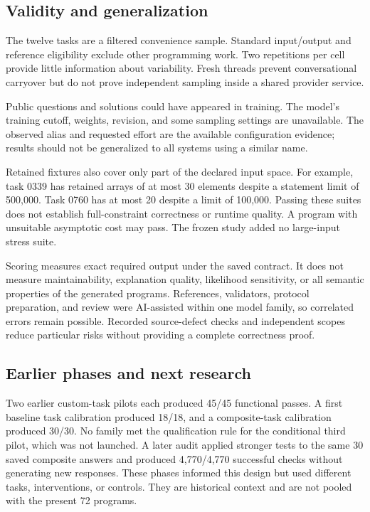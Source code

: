\documentclass[conference,a4paper]{IEEEtran}
\begin{document}
\subsection{Validity and generalization}
The twelve tasks are a filtered convenience sample. Standard input/output and reference eligibility exclude other programming work. Two repetitions per cell provide little information about variability. Fresh threads prevent conversational carryover but do not prove independent sampling inside a shared provider service.

Public questions and solutions could have appeared in training. The model's training cutoff, weights, revision, and some sampling settings are unavailable. The observed alias and requested effort are the available configuration evidence; results should not be generalized to all systems using a similar name.

Retained fixtures also cover only part of the declared input space. For example, task 0339 has retained arrays of at most 30 elements despite a statement limit of 500,000. Task 0760 has at most 20 despite a limit of 100,000. Passing these suites does not establish full-constraint correctness or runtime quality. A program with unsuitable asymptotic cost may pass. The frozen study added no large-input stress suite.

Scoring measures exact required output under the saved contract. It does not measure maintainability, explanation quality, likelihood sensitivity, or all semantic properties of the generated programs. References, validators, protocol preparation, and review were AI-assisted within one model family, so correlated errors remain possible. Recorded source-defect checks and independent scopes reduce particular risks without providing a complete correctness proof.

\subsection{Earlier phases and next research}
Two earlier custom-task pilots each produced 45/45 functional passes. A first baseline task calibration produced 18/18, and a composite-task calibration produced 30/30. No family met the qualification rule for the conditional third pilot, which was not launched. A later audit applied stronger tests to the same 30 saved composite answers and produced 4,770/4,770 successful checks without generating new responses. These phases informed this design but used different tasks, interventions, or controls. They are historical context and are not pooled with the present 72 programs.
\end{document}

